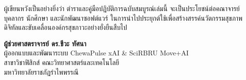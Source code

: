 ผู้เขียนหวังเป็นอย่างยิ่งว่า ตำราและคู่มือปฏิบัติการฉบับสมบูรณ์เล่มนี้ จะเป็นประโยชน์ต่อคณาจารย์ บุคลากร นักศึกษา และนักพัฒนาซอฟต์แวร์ ในการนำไปประยุกต์ใช้เพื่อสร้างสรรค์นวัตกรรมสุขภาพดิจิทัลและขับเคลื่อนองค์กรสุขภาวะอย่างยั่งยืนสืบไป

\vspace{1.0cm}

\begin{flushright}
  \textbf{ผู้ช่วยศาสตราจารย์ ดร.ชีวะ ทัศนา}\\
  ผู้ออกแบบและพัฒนาระบบ ChewaPulse xAI \& SciRBRU Move+AI\\
  สาขาวิชาฟิสิกส์ คณะวิทยาศาสตร์และเทคโนโลยี\\
  มหาวิทยาลัยราชภัฏรำไพพรรณี
\end{flushright}
